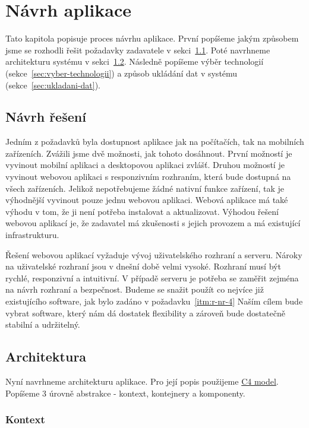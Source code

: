 \chapter{Návrh aplikace}\label{ch:navrh-aplikace}

Tato kapitola popisuje proces návrhu aplikace.
První popíšeme jakým způsobem jsme se rozhodli řešit požadavky zadavatele v sekci~\ref{sec:navrh-reseni}.
Poté navrhneme architekturu systému v sekci~\ref{sec:architektura}.
Následně popíšeme výběr technologií (sekce~\ref{sec:vyber-technologii}) a způsob ukládání dat v systému (sekce~\ref{sec:ukladani-dat}).


\section{Návrh řešení}\label{sec:navrh-reseni}

Jedním z požadavků byla dostupnost aplikace jak na počítačích, tak na mobilních zařízeních.
Zvážili jsme dvě možnosti, jak tohoto dosáhnout.
První možností je vyvinout mobilní aplikaci a desktopovou aplikaci zvlášť.
Druhou možností je vyvinout webovou aplikaci s responzivním rozhraním, která bude dostupná na všech zařízeních.
Jelikož nepotřebujeme žádné nativní funkce zařízení, tak je výhodnější vyvinout pouze jednu webovou aplikaci.
Webová aplikace má také výhodu v tom, že ji není potřeba instalovat a aktualizovat.
Výhodou řešení webovou aplikací je, že zadavatel má zkušenosti s jejich provozem a má existující infrastrukturu.

Řešení webovou aplikací vyžaduje vývoj uživatelského rozhraní a serveru.
Nároky na uživatelské rozhraní jsou v dnešní době velmi vysoké.
Rozhraní musí být rychlé, responzivní a intuitivní.
V případě serveru je potřeba se zaměřit zejména na návrh rozhraní a bezpečnost.
Budeme se snažit použít co nejvíce již existujícího software, jak bylo zadáno v požadavku~\ref{itm:r-nr-4}
Naším cílem bude vybrat software, který nám dá dostatek flexibility a zároveň bude dostatečně stabilní a udržitelný.


\section{Architektura}\label{sec:architektura}

Nyní navrhneme architekturu aplikace.
Pro její popis použijeme \href{https://c4model.com/}{C4 model}.
Popíšeme 3 úrovně abstrakce - kontext, kontejnery a komponenty.

\subsection{Kontext}\label{subsec:kontext}

